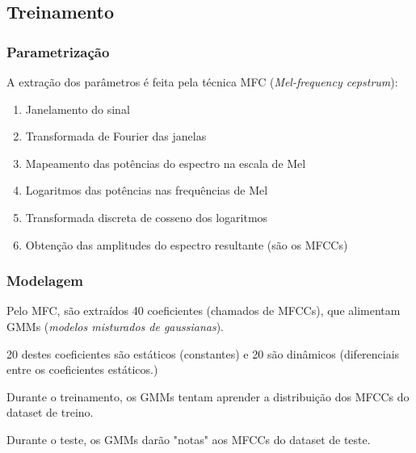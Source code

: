 \documentclass{beamer}
\begin{document}
\subsection{Treinamento}

\begin{frame} %
    \frametitle{Parametrização}

    A extração dos parâmetros é feita pela técnica MFC (\emph{Mel-frequency cepstrum}):

    \begin{enumerate}
        \item Janelamento do sinal
        \item Transformada de Fourier das janelas
        \item Mapeamento das potências do espectro na escala de Mel
        \item Logaritmos das potências nas frequências de Mel
        \item Transformada discreta de cosseno dos logaritmos
        \item Obtenção das amplitudes do espectro resultante (são os MFCCs)
    \end{enumerate}

\end{frame}

\begin{frame} %
    \frametitle{Modelagem}

    Pelo MFC, são extraídos 40 coeficientes (chamados de MFCCs), que alimentam GMMs (\emph{modelos misturados de gaussianas}).

    \medskip

    20 destes coeficientes são estáticos (constantes) e 20 são dinâmicos (diferenciais entre os coeficientes estáticos.)

    \medskip

    Durante o treinamento, os GMMs tentam aprender a distribuição dos MFCCs do dataset de treino.

    \medskip


    Durante o teste, os GMMs darão "notas" aos MFCCs do dataset de teste. 

\end{frame}
\end{document}
